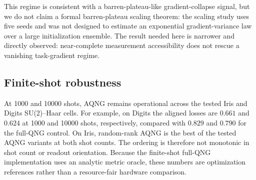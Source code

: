 This regime is consistent with a barren-plateau-like gradient-collapse signal, but we do not claim a formal barren-plateau scaling theorem: the scaling study uses five seeds and was not designed to estimate an exponential gradient-variance law over a large initialization ensemble. The result needed here is narrower and directly observed: near-complete measurement accessibility does not rescue a vanishing task-gradient regime.

\subsection{Finite-shot robustness}
At 1000 and 10000 shots, AQNG remains operational across the tested Iris and Digits SU(2)--Haar cells. For example, on Digits the aligned losses are $0.661$ and $0.624$ at 1000 and 10000 shots, respectively, compared with $0.829$ and $0.790$ for the full-QNG control. On Iris, random-rank AQNG is the best of the tested AQNG variants at both shot counts. The ordering is therefore not monotonic in shot count or readout orientation. Because the finite-shot full-QNG implementation uses an analytic metric oracle, these numbers are optimization references rather than a resource-fair hardware comparison.
